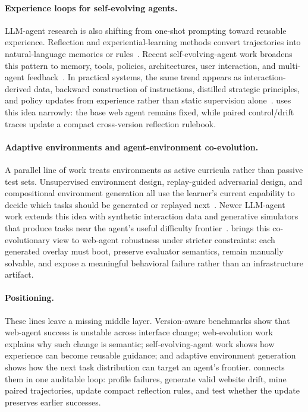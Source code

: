 \paragraph{Experience loops for self-evolving agents.}
LLM-agent research is also shifting from one-shot prompting toward reusable experience. Reflection and experiential-learning methods convert trajectories into natural-language memories or rules~\citep{shinn2023reflexion,zhao2023expel}. Recent self-evolving-agent work broadens this pattern to memory, tools, policies, architectures, user interaction, and multi-agent feedback~\citep{gao2025selfevolvingagents}. In practical systems, the same trend appears as interaction-derived data, backward construction of instructions, distilled strategic principles, and policy updates from experience rather than static supervision alone~\citep{learnbyinteract2025,wu2025evolver,liang2025sage,comas2025}. \webcoevo{} uses this idea narrowly: the base web agent remains fixed, while paired control/drift traces update a compact cross-version reflection rulebook.

\paragraph{Adaptive environments and agent-environment co-evolution.}
A parallel line of work treats environments as active curricula rather than passive test sets. Unsupervised environment design, replay-guided adversarial design, and compositional environment generation all use the learner's current capability to decide which tasks should be generated or replayed next~\citep{dennis2020paired,jiang2021replayguided,gur2021code}. Newer LLM-agent work extends this idea with synthetic interaction data and generative simulators that produce tasks near the agent's useful difficulty frontier~\citep{learnbyinteract2025,genenv2025}. \webcoevo{} brings this co-evolutionary view to web-agent robustness under stricter constraints: each generated \linkding{} overlay must boot, preserve evaluator semantics, remain manually solvable, and expose a meaningful behavioral failure rather than an infrastructure artifact.

\paragraph{Positioning.}
These lines leave a missing middle layer. Version-aware benchmarks show that web-agent success is unstable across interface change; web-evolution work explains why such change is semantic; self-evolving-agent work shows how experience can become reusable guidance; and adaptive environment generation shows how the next task distribution can target an agent's frontier. \webcoevo{} connects them in one auditable loop: profile failures, generate valid website drift, mine paired trajectories, update compact reflection rules, and test whether the update preserves earlier successes.
